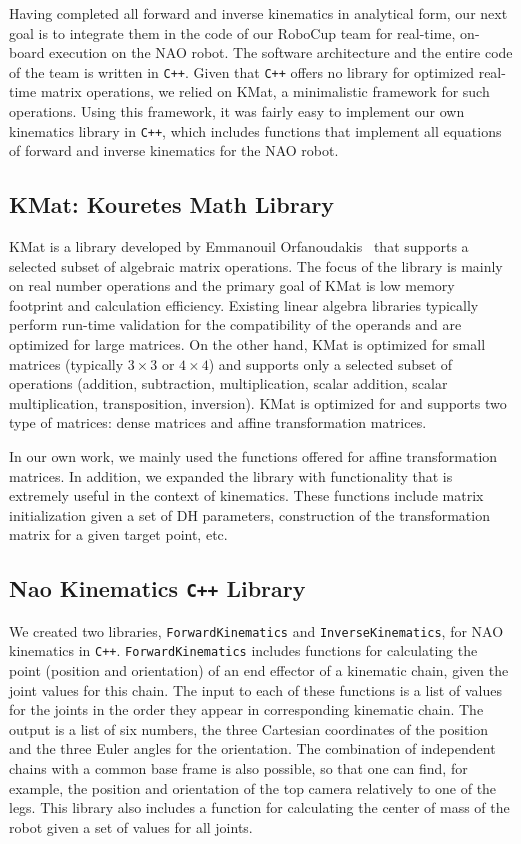 Having completed all forward and inverse kinematics in analytical form, our next goal is to integrate them in the code of our RoboCup team for real-time, on-board execution on the NAO robot. The software architecture and the entire code of the team is written in {\tt C++}. Given that {\tt C++} offers no library for optimized real-time matrix operations, we relied on KMat, a minimalistic framework for such operations. Using this framework, it was fairly easy to implement our own kinematics library in {\tt C++}, which includes functions that implement all equations of forward and inverse kinematics for the NAO robot.

\subsection{KMat: Kouretes Math Library}
KMat is a library developed by Emmanouil Orfanoudakis~\cite{orfanoudakis2011} that supports a selected subset of algebraic matrix operations. The focus of the library is mainly on real number operations and the primary goal of KMat is low memory footprint and calculation efficiency. Existing linear algebra libraries typically perform run-time validation for the compatibility of the operands and are optimized for large matrices. On the other hand, KMat is optimized for small matrices (typically $3\times3$ or $4\times4$) and supports only a selected subset of operations (addition, subtraction, multiplication, scalar addition, scalar multiplication, transposition, inversion). KMat is optimized for and supports two type of matrices: dense matrices and affine transformation matrices.

In our own work, we mainly used the functions offered for affine transformation matrices. In addition, we expanded the library with functionality that is extremely useful in the context of kinematics. These functions include matrix initialization given a set of DH parameters, construction of the transformation matrix for a given target point, etc.

\subsection{Nao Kinematics {\tt C++} Library}

We created two libraries, \texttt{ForwardKinematics} and \texttt{InverseKinematics}, for NAO kinematics in {\tt C++}. \texttt{ForwardKinematics} includes functions for calculating the point (position and orientation) of an end effector of a kinematic chain, given the joint values for this chain. The input to each of these functions is a list of values for the joints in the order they appear in corresponding kinematic chain. The output is a list of six numbers, the three Cartesian coordinates of the position and the three Euler angles for the orientation. The combination of independent chains with a common base frame is also possible, so that one can find, for example, the position and orientation of the top camera relatively to one of the legs. This library also includes a function for calculating the center of mass of the robot given a set of values for all joints.

